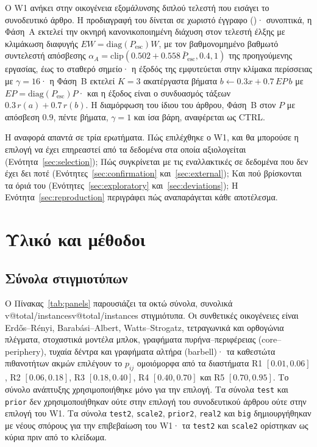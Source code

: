 \documentclass[11pt,a4paper]{article}
\makeatletter
\newcommand{\V}[1]{\ifcsname v@#1\endcsname\csname v@#1\endcsname\else\errmessage{missing value #1}\fi}
\newcommand{\Pesc}{P_{\mathrm{esc}}}
\newcommand{\Pescbar}{\bar{P}_{\mathrm{esc}}}
\newcommand{\p}[1]{\texttt{#1}}
\makeatother
\begin{document}
Ο W1 ανήκει στην οικογένεια εξομάλυνσης διπλού τελεστή που εισάγει το συνοδευτικό άρθρο. Η προδιαγραφή του δίνεται σε χωριστό έγγραφο ()· συνοπτικά, η Φάση~Α εκτελεί την οκνηρή κανονικοποιημένη διάχυση στον τελεστή έλξης με κλιμάκωση διαφυγής $EW=\mathrm{diag}(\Pesc)W$, με τον βαθμονομημένο βαθμωτό συντελεστή απόσβεσης $\alpha_A=\mathrm{clip}(0.502+0.558\,\Pescbar,0.4,1)$ της προηγούμενης εργασίας, έως το σταθερό σημείο· η έξοδός της εμφυτεύεται στην κλίμακα περίσσειας με $\gamma=16$· η Φάση~Β εκτελεί $K=3$ ακατέργαστα βήματα $b\leftarrow0.3x+0.7\,EP\,b$ με $EP=\mathrm{diag}(\Pesc)P$· και η έξοδος είναι ο συνδυασμός τάξεων $0.3\,r(a)+0.7\,r(b)$. Η διαμόρφωση του ίδιου του άρθρου, Φάση~Β στον $P$ με απόσβεση $0.9$, πέντε βήματα, $\gamma=1$ και ίσα βάρη, αναφέρεται ως CTRL.

Η αναφορά απαντά σε τρία ερωτήματα. Πώς επιλέχθηκε ο W1, και θα μπορούσε η επιλογή να έχει επηρεαστεί από τα δεδομένα στα οποία αξιολογείται (Ενότητα~\ref{sec:selection}); Πώς συγκρίνεται με τις εναλλακτικές σε δεδομένα που δεν έχει δει ποτέ (Ενότητες~\ref{sec:confirmation} και~\ref{sec:external}); Και πού βρίσκονται τα όριά του (Ενότητες~\ref{sec:exploratory} και~\ref{sec:deviations}); Η Ενότητα~\ref{sec:reproduction} περιγράφει πώς αναπαράγεται κάθε αποτέλεσμα.

\section{Υλικό και μέθοδοι}\label{sec:materials}

\subsection{Σύνολα στιγμιοτύπων}

Ο Πίνακας~\ref{tab:panels} παρουσιάζει τα οκτώ σύνολα, συνολικά \V{total/instances} στιγμιότυπα. Οι συνθετικές οικογένειες είναι Erdős--Rényi, Barabási--Albert, Watts--Strogatz, τετραγωνικά και ορθογώνια πλέγματα, στοχαστικά μοντέλα μπλοκ, γραφήματα πυρήνα--περιφέρειας (core--periphery), τυχαία δέντρα και γραφήματα αλτήρα (barbell)· τα καθεστώτα πιθανοτήτων ακμών επιλέγουν το $p_{ij}$ ομοιόμορφα από τα διαστήματα R1 $[0.01,0.06]$, R2 $[0.06,0.18]$, R3 $[0.18,0.40]$, R4 $[0.40,0.70]$ και R5 $[0.70,0.95]$. Το σύνολο ανάπτυξης χρησιμοποιήθηκε μόνο για την επιλογή. Τα σύνολα \p{test} και \p{prior} δεν χρησιμοποιήθηκαν ούτε στην επιλογή του συνοδευτικού άρθρου ούτε στην επιλογή του W1. Τα σύνολα \p{test2}, \p{scale2}, \p{prior2}, \p{real2} και \p{big} δημιουργήθηκαν με νέους σπόρους για την επιβεβαίωση του W1· τα \p{test2} και \p{scale2} ορίστηκαν ως κύρια πριν από το κλείδωμα.
\end{document}
